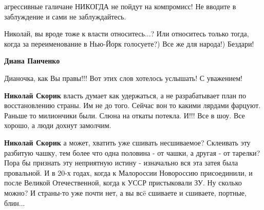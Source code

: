 \begin{itemize}
\begin{itemize}
 
агрессивные галичане НИКОГДА не пойдут на компромисс! Не вводите в заблуждение и сами не заблуждайтесь.


 

Николай, вы вроде тоже к власти относитесь...? Или относитесь только тогда,
когда за переименование в Нью-Йорк голосуете?) Все же для народа!) Бездари!

 
\textbf{Диана Панченко} 

Дианочка, как Вы правы!!! Вот этих слов хотелось услышать! С уважением! 💓


 
\textbf{Николай Скорик} власть думает как удержаться, а не разрабатывает план
по восстановлению страны. Им не до того. Сейчас вон то какими лярдами фарцуют.
Раньше то милиончики были. Слюна на откаты потекла. И!!! Все в шоу. Все хорошо,
а люди дохнут замолчим.

 
\textbf{Николай Скорик} а может, хватить уже сшивать несшиваемое? Склеивать эту
разбитую чашку, тем более что одна половина - от чашки, а другая - от тарелки?
Пора бы признать эту неприятную истину - изначально вся эта затея была
провальной. И в 20-х годах, когда к Малороссии Новороссию присоединили, и после
Великой Отечественной, когда к УССР пристыковали ЗУ. Ну сколько можно? И
страны-то уже почти нет, а вы всë сшиваете и сшиваете, портные, блин...


\end{itemize}
\end{itemize}
